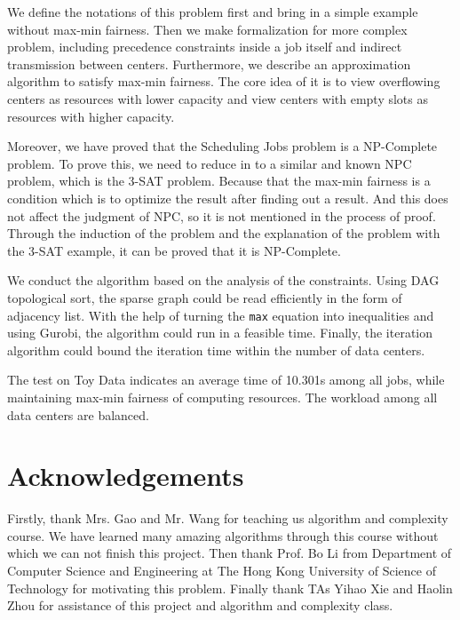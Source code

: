 \documentclass{llncs}
\begin{document}
We define the notations of this problem first and bring in a simple example without max-min fairness. Then we make formalization for more complex problem, including precedence constraints inside a job itself and indirect transmission between centers. Furthermore, we describe an approximation algorithm to satisfy max-min fairness. The core idea of it is to view overflowing centers as resources with lower capacity and view centers with empty slots as resources with higher capacity.

Moreover, we have proved that the Scheduling Jobs problem is a NP-Complete problem. To prove this, we need to reduce in to a similar and known NPC problem, which is the 3-SAT problem. Because that the max-min fairness is a condition which is to optimize the result after finding out a result. And this does not affect the judgment of NPC, so it is not mentioned in the process of proof. Through the induction of the problem and the explanation of the problem with the 3-SAT example, it can be proved that it is NP-Complete.

We conduct the algorithm based on the analysis of the constraints. Using DAG topological sort, the sparse graph could be read efficiently in the form of adjacency list. With the help of turning the \texttt{max} equation into inequalities and using Gurobi, the algorithm could run in a feasible time. Finally, the iteration algorithm could bound the iteration time within the number of data centers.

The test on Toy Data indicates an average time of 10.301s among all jobs, while maintaining max-min fairness of computing resources. The workload among all data centers are balanced.

\section*{Acknowledgements}

Firstly, thank Mrs. Gao and Mr. Wang for teaching us algorithm and complexity course. We have learned many amazing algorithms through this course without which we can not finish this project. Then thank Prof. Bo Li from Department of Computer Science and Engineering at The Hong Kong University of Science of Technology for motivating this problem. Finally thank TAs Yihao Xie and Haolin Zhou for assistance of this project and algorithm and complexity class.


\end{document}
